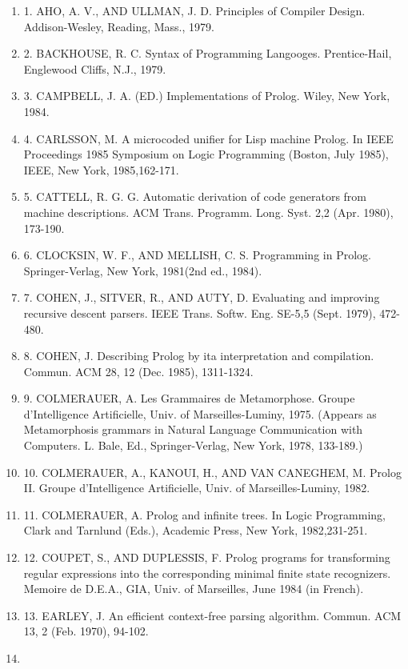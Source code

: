 
\begin{enumerate}
  \item 
1. AHO, A. V., AND ULLMAN, J. D. Principles of Compiler Design. Addison-Wesley, Reading, Mass.,
1979.
  \item 
2. BACKHOUSE, R. C. Syntax of Programming Langooges. Prentice-Hail, Englewood Cliffs, N.J.,
1979.
  \item 
3. CAMPBELL, J. A. (ED.) Implementations of Prolog. Wiley, New York, 1984.
  \item 
4. CARLSSON, M. A microcoded unifier for Lisp machine Prolog. In IEEE Proceedings 1985
Symposium on Logic Programming (Boston, July 1985), IEEE, New York, 1985,162-171.
  \item 
5. CATTELL, R. G. G. Automatic derivation of code generators from machine descriptions. ACM
Trans. Programm. Long. Syst. 2,2 (Apr. 1980), 173-190.
  \item 
6. CLOCKSIN, W. F., AND MELLISH, C. S. Programming in Prolog. Springer-Verlag, New York,
1981(2nd ed., 1984).
  \item 
7. COHEN, J., SITVER, R., AND AUTY, D. Evaluating and improving recursive descent parsers.
IEEE Trans. Softw. Eng. SE-5,5 (Sept. 1979), 472-480.
  \item 
8. COHEN, J. Describing Prolog by ita interpretation and compilation. Commun. ACM 28, 12
(Dec. 1985), 1311-1324.
  \item 
9. COLMERAUER, A. Les Grammaires de Metamorphose. Groupe d’Intelligence Artificielle, Univ.
of Marseilles-Luminy, 1975. (Appears as Metamorphosis grammars in Natural Language Communication
with Computers. L. Bale, Ed., Springer-Verlag, New York, 1978, 133-189.)
  \item 
10. COLMERAUER, A., KANOUI, H., AND VAN CANEGHEM, M. Prolog II. Groupe d’Intelligence
Artificielle, Univ. of Marseilles-Luminy, 1982.
  \item 
11. COLMERAUER, A. Prolog and infinite trees. In Logic Programming, Clark and Tarnlund (Eds.),
Academic Press, New York, 1982,231-251.
  \item 
12. COUPET, S., AND DUPLESSIS, F. Prolog programs for transforming regular expressions into the
corresponding minimal finite state recognizers. Memoire de D.E.A., GIA, Univ. of Marseilles,
June 1984 (in French).
  \item 
13. EARLEY, J. An efficient context-free parsing algorithm. Commun. ACM 13, 2 (Feb. 1970),
94-102.
  \item 

\end{enumerate}
